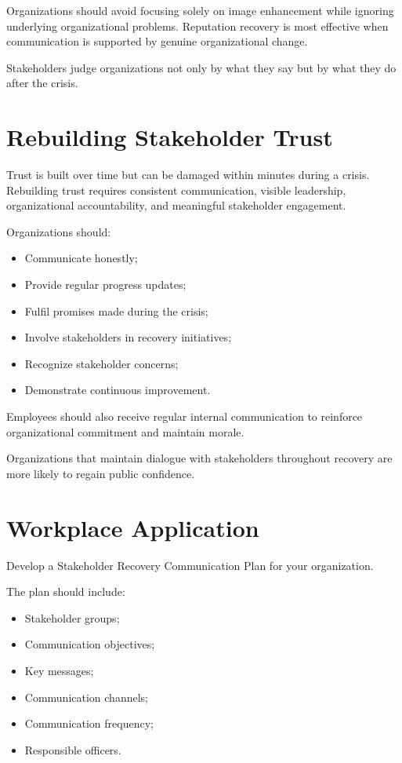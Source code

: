\documentclass[10pt]{article}
\begin{document}
Organizations should avoid focusing solely on image enhancement while ignoring underlying organizational problems. Reputation recovery is most effective when communication is supported by genuine organizational change.

Stakeholders judge organizations not only by what they say but by what they do after the crisis.

\section*{Rebuilding Stakeholder Trust}

Trust is built over time but can be damaged within minutes during a crisis. Rebuilding trust requires consistent communication, visible leadership, organizational accountability, and meaningful stakeholder engagement.

Organizations should:
\begin{itemize}
    \item Communicate honestly;
    \item Provide regular progress updates;
    \item Fulfil promises made during the crisis;
    \item Involve stakeholders in recovery initiatives;
    \item Recognize stakeholder concerns;
    \item Demonstrate continuous improvement.
\end{itemize}

Employees should also receive regular internal communication to reinforce organizational commitment and maintain morale.

Organizations that maintain dialogue with stakeholders throughout recovery are more likely to regain public confidence.

\section*{Workplace Application}

Develop a Stakeholder Recovery Communication Plan for your organization.

The plan should include:
\begin{itemize}
    \item Stakeholder groups;
    \item Communication objectives;
    \item Key messages;
    \item Communication channels;
    \item Communication frequency;
    \item Responsible officers.
\end{itemize}
\end{document}
